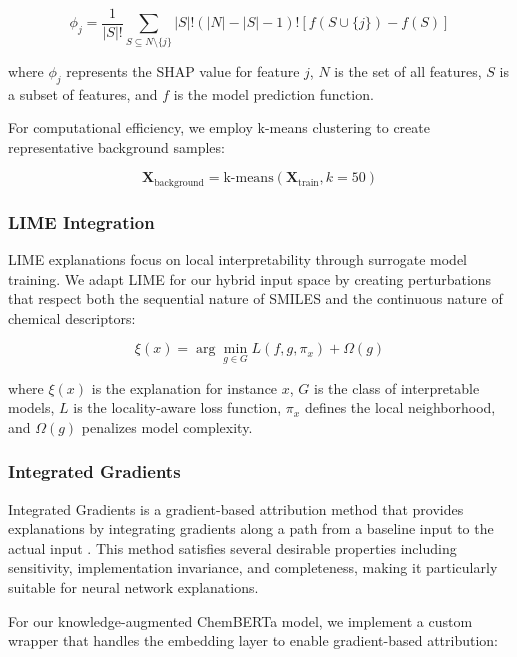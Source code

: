 \documentclass[preprint,12pt]{elsarticle}
\begin{document}
\begin{equation}
\phi_j = \frac{1}{|S|!} \sum_{S \subseteq N \setminus \{j\}} |S|!(|N|-|S|-1)![f(S \cup \{j\}) - f(S)]
\end{equation}

where $\phi_j$ represents the SHAP value for feature $j$, $N$ is the set of all features, $S$ is a subset of features, and $f$ is the model prediction function.

For computational efficiency, we employ k-means clustering to create representative background samples:

\begin{equation}
\mathbf{X}_{\text{background}} = \text{k-means}(\mathbf{X}_{\text{train}}, k=50)
\end{equation}

\subsubsection*{LIME Integration}

LIME explanations focus on local interpretability through surrogate model training. We adapt LIME for our hybrid input space by creating perturbations that respect both the sequential nature of SMILES and the continuous nature of chemical descriptors:

\begin{equation}
\xi(x) = \arg\min_{g \in G} L(f, g, \pi_x) + \Omega(g)
\end{equation}

where $\xi(x)$ is the explanation for instance $x$, $G$ is the class of interpretable models, $L$ is the locality-aware loss function, $\pi_x$ defines the local neighborhood, and $\Omega(g)$ penalizes model complexity.

\subsubsection*{Integrated Gradients}

Integrated Gradients is a gradient-based attribution method that provides explanations by integrating gradients along a path from a baseline input to the actual input \cite{sundararajan2017axiomatic}. This method satisfies several desirable properties including sensitivity, implementation invariance, and completeness, making it particularly suitable for neural network explanations.

For our knowledge-augmented ChemBERTa model, we implement a custom wrapper that handles the embedding layer to enable gradient-based attribution:
\end{document}
